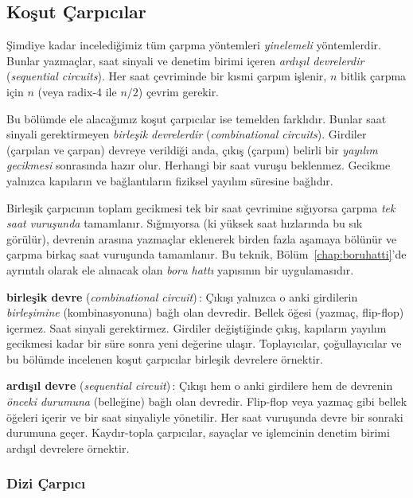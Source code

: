 \subsection{Koşut Çarpıcılar}
\label{sec:paralel-carpicilar}

Şimdiye kadar incelediğimiz tüm çarpma yöntemleri \emph{yinelemeli} yöntemlerdir. Bunlar yazmaçlar, saat sinyali ve denetim birimi içeren \emph{ardışıl devrelerdir} (\emph{sequential circuits}). Her saat çevriminde bir kısmi çarpım işlenir, $n$ bitlik çarpma için $n$ (veya radix-4 ile $n/2$) çevrim gerekir.

Bu bölümde ele alacağımız koşut çarpıcılar ise temelden farklıdır. Bunlar saat sinyali gerektirmeyen \emph{birleşik devrelerdir} (\emph{combinational circuits}). Girdiler (çarpılan ve çarpan) devreye verildiği anda, çıkış (çarpım) belirli bir \emph{yayılım gecikmesi} sonrasında hazır olur. Herhangi bir saat vuruşu beklenmez. Gecikme yalnızca kapıların ve bağlantıların fiziksel yayılım süresine bağlıdır.

Birleşik çarpıcının toplam gecikmesi tek bir saat çevrimine sığıyorsa çarpma \emph{tek saat vuruşunda} tamamlanır. Sığmıyorsa (ki yüksek saat hızlarında bu sık görülür), devrenin arasına yazmaçlar eklenerek birden fazla aşamaya bölünür ve çarpma birkaç saat vuruşunda tamamlanır. Bu teknik, Bölüm~\ref{chap:boruhatti}'de ayrıntılı olarak ele alınacak olan \emph{boru hattı} yapısının bir uygulamasıdır.

\begin{terimnotu}
\textbf{birleşik devre} (\emph{combinational circuit})\,: Çıkışı yalnızca o anki girdilerin \emph{birleşimine} (kombinasyonuna) bağlı olan devredir. Bellek öğesi (yazmaç, flip-flop) içermez. Saat sinyali gerektirmez. Girdiler değiştiğinde çıkış, kapıların yayılım gecikmesi kadar bir süre sonra yeni değerine ulaşır. Toplayıcılar, çoğullayıcılar ve bu bölümde incelenen koşut çarpıcılar birleşik devrelere örnektir.

\textbf{ardışıl devre} (\emph{sequential circuit})\,: Çıkışı hem o anki girdilere hem de devrenin \emph{önceki durumuna} (belleğine) bağlı olan devredir. Flip-flop veya yazmaç gibi bellek öğeleri içerir ve bir saat sinyaliyle yönetilir. Her saat vuruşunda devre bir sonraki durumuna geçer. Kaydır-topla çarpıcılar, sayaçlar ve işlemcinin denetim birimi ardışıl devrelere örnektir.
\end{terimnotu}

\subsubsection{Dizi Çarpıcı}
\label{sec:dizi-carpici}

